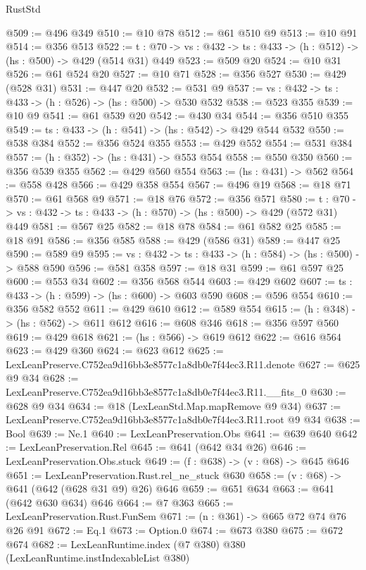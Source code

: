 \begin{lexlean}{RustStd}
\begin{coremodule}
@509 := @496 @349
@510 := @10 @78
@512 := @61 @510 @9
@513 := @10 @91
@514 := @356 @513
@522 := {t : @70} -> {vs : @432} -> {ts : @433} -> (h : @512) -> (hs : @500) -> @429 (@514 @31) @449
@523 := @509 @20
@524 := @10 @31
@526 := @61 @524 @20
@527 := @10 @71
@528 := @356 @527
@530 := @429 (@528 @31)
@531 := @447 @20
@532 := @531 @9
@537 := {vs : @432} -> {ts : @433} -> (h : @526) -> (hs : @500) -> @530 @532
@538 := @523 @355
@539 := @10 @9
@541 := @61 @539 @20
@542 := @430 @34
@544 := @356 @510 @355
@549 := {ts : @433} -> (h : @541) -> (hs : @542) -> @429 @544 @532
@550 := @538 @384
@552 := @356 @524 @355
@553 := @429 @552
@554 := @531 @384
@557 := (h : @352) -> (hs : @431) -> @553 @554
@558 := @550 @350
@560 := @356 @539 @355
@562 := @429 @560 @554
@563 := (hs : @431) -> @562
@564 := @558 @428
@566 := @429 @358 @554
@567 := @496 @19
@568 := @18 @71
@570 := @61 @568 @9
@571 := @18 @76
@572 := @356 @571
@580 := {t : @70} -> {vs : @432} -> {ts : @433} -> (h : @570) -> (hs : @500) -> @429 (@572 @31) @449
@581 := @567 @25
@582 := @18 @78
@584 := @61 @582 @25
@585 := @18 @91
@586 := @356 @585
@588 := @429 (@586 @31)
@589 := @447 @25
@590 := @589 @9
@595 := {vs : @432} -> {ts : @433} -> (h : @584) -> (hs : @500) -> @588 @590
@596 := @581 @358
@597 := @18 @31
@599 := @61 @597 @25
@600 := @553 @34
@602 := @356 @568 @544
@603 := @429 @602
@607 := {ts : @433} -> (h : @599) -> (hs : @600) -> @603 @590
@608 := @596 @554
@610 := @356 @582 @552
@611 := @429 @610
@612 := @589 @554
@615 := (h : @348) -> (hs : @562) -> @611 @612
@616 := @608 @346
@618 := @356 @597 @560
@619 := @429 @618
@621 := (hs : @566) -> @619 @612
@622 := @616 @564
@623 := @429 @360
@624 := @623 @612
@625 := LexLeanPreserve.C752ea9d16bb3e8577c1a8db0e7f44ec3.R11.denote
@627 := @625 @9 @34
@628 := LexLeanPreserve.C752ea9d16bb3e8577c1a8db0e7f44ec3.R11.__fits_0
@630 := @628 @9 @34
@634 := @18 (LexLeanStd.Map.mapRemove @9 @34)
@637 := LexLeanPreserve.C752ea9d16bb3e8577c1a8db0e7f44ec3.R11.root @9 @34
@638 := Bool
@639 := Ne.{1}
@640 := LexLeanPreservation.Obs
@641 := @639 @640
@642 := LexLeanPreservation.Rel
@645 := @641 (@642 @34 @26)
@646 := LexLeanPreservation.Obs.stuck
@649 := (f : @638) -> (v : @68) -> @645 @646
@651 := LexLeanPreservation.Rust.rel_ne_stuck @630
@658 := (v : @68) -> @641 (@642 (@628 @31 @9) @26) @646
@659 := @651 @634
@663 := @641 (@642 @630 @634) @646
@664 := @7 @363
@665 := LexLeanPreservation.Rust.FunSem
@671 := (n : @361) -> @665 @72 @74 @76 @26 @91
@672 := Eq.{1}
@673 := Option.{0}
@674 := @673 @380
@675 := @672 @674
@682 := LexLeanRuntime.index (@7 @380) @380 (LexLeanRuntime.instIndexableList @380)

\end{coremodule}
\end{lexlean}
